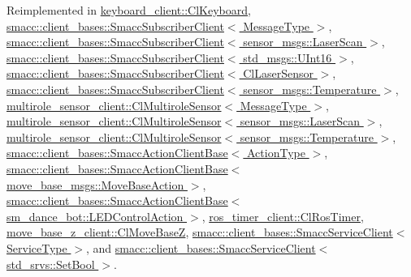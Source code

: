 Reimplemented in \hyperlink{classkeyboard__client_1_1ClKeyboard_a7ac4502969c62b0c836b531cec05f8ed}{keyboard\+\_\+client\+::\+Cl\+Keyboard}, \hyperlink{classsmacc_1_1client__bases_1_1SmaccSubscriberClient_af188f0f5e89de26a07e1f964cdd23a70}{smacc\+::client\+\_\+bases\+::\+Smacc\+Subscriber\+Client$<$ Message\+Type $>$}, \hyperlink{classsmacc_1_1client__bases_1_1SmaccSubscriberClient_af188f0f5e89de26a07e1f964cdd23a70}{smacc\+::client\+\_\+bases\+::\+Smacc\+Subscriber\+Client$<$ sensor\+\_\+msgs\+::\+Laser\+Scan $>$}, \hyperlink{classsmacc_1_1client__bases_1_1SmaccSubscriberClient_af188f0f5e89de26a07e1f964cdd23a70}{smacc\+::client\+\_\+bases\+::\+Smacc\+Subscriber\+Client$<$ std\+\_\+msgs\+::\+U\+Int16 $>$}, \hyperlink{classsmacc_1_1client__bases_1_1SmaccSubscriberClient_af188f0f5e89de26a07e1f964cdd23a70}{smacc\+::client\+\_\+bases\+::\+Smacc\+Subscriber\+Client$<$ Cl\+Laser\+Sensor $>$}, \hyperlink{classsmacc_1_1client__bases_1_1SmaccSubscriberClient_af188f0f5e89de26a07e1f964cdd23a70}{smacc\+::client\+\_\+bases\+::\+Smacc\+Subscriber\+Client$<$ sensor\+\_\+msgs\+::\+Temperature $>$}, \hyperlink{classmultirole__sensor__client_1_1ClMultiroleSensor_a8cd8e9766dd4e0f4d3be69d7979c5e50}{multirole\+\_\+sensor\+\_\+client\+::\+Cl\+Multirole\+Sensor$<$ Message\+Type $>$}, \hyperlink{classmultirole__sensor__client_1_1ClMultiroleSensor_a8cd8e9766dd4e0f4d3be69d7979c5e50}{multirole\+\_\+sensor\+\_\+client\+::\+Cl\+Multirole\+Sensor$<$ sensor\+\_\+msgs\+::\+Laser\+Scan $>$}, \hyperlink{classmultirole__sensor__client_1_1ClMultiroleSensor_a8cd8e9766dd4e0f4d3be69d7979c5e50}{multirole\+\_\+sensor\+\_\+client\+::\+Cl\+Multirole\+Sensor$<$ sensor\+\_\+msgs\+::\+Temperature $>$}, \hyperlink{classsmacc_1_1client__bases_1_1SmaccActionClientBase_a72967f255f85e35718a1e1b0b48c38ff}{smacc\+::client\+\_\+bases\+::\+Smacc\+Action\+Client\+Base$<$ Action\+Type $>$}, \hyperlink{classsmacc_1_1client__bases_1_1SmaccActionClientBase_a72967f255f85e35718a1e1b0b48c38ff}{smacc\+::client\+\_\+bases\+::\+Smacc\+Action\+Client\+Base$<$ move\+\_\+base\+\_\+msgs\+::\+Move\+Base\+Action $>$}, \hyperlink{classsmacc_1_1client__bases_1_1SmaccActionClientBase_a72967f255f85e35718a1e1b0b48c38ff}{smacc\+::client\+\_\+bases\+::\+Smacc\+Action\+Client\+Base$<$ sm\+\_\+dance\+\_\+bot\+::\+L\+E\+D\+Control\+Action $>$}, \hyperlink{classros__timer__client_1_1ClRosTimer_a2d290d2a5d0afa7cdab543b17dbddbff}{ros\+\_\+timer\+\_\+client\+::\+Cl\+Ros\+Timer}, \hyperlink{classmove__base__z__client_1_1ClMoveBaseZ_a082cef8bf5dbd0ec06adfe2a7aefbf70}{move\+\_\+base\+\_\+z\+\_\+client\+::\+Cl\+Move\+BaseZ}, \hyperlink{classsmacc_1_1client__bases_1_1SmaccServiceClient_aa51b80828e4ab19627210440ae15b6f3}{smacc\+::client\+\_\+bases\+::\+Smacc\+Service\+Client$<$ Service\+Type $>$}, and \hyperlink{classsmacc_1_1client__bases_1_1SmaccServiceClient_aa51b80828e4ab19627210440ae15b6f3}{smacc\+::client\+\_\+bases\+::\+Smacc\+Service\+Client$<$ std\+\_\+srvs\+::\+Set\+Bool $>$}.



